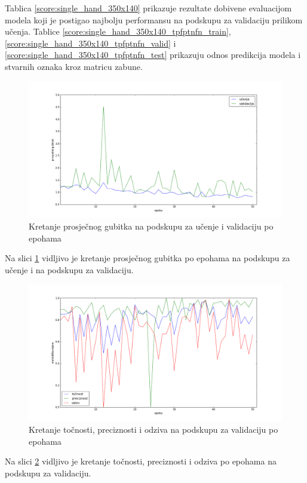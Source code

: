 \documentclass[times, utf8, diplomski, numeric]{fer}
\begin{document}
\noindent Tablica \ref{score:single_hand_350x140} prikazuje rezultate dobivene evaluacijom modela koji je postigao najbolju performansu na podskupu za validaciju prilikom učenja.
Tablice \ref{score:single_hand_350x140_tpfptnfn_train}, \ref{score:single_hand_350x140_tpfptnfn_valid} i \ref{score:single_hand_350x140_tpfptnfn_test} prikazuju odnos predikcija modela i stvarnih oznaka kroz matricu zabune.

\begin{figure}[H]
\centering
\includegraphics[scale=0.35]{images/single_hand_scale050_loss.png}
\caption{Kretanje prosječnog gubitka na podskupu za učenje i validaciju po epohama}
\label{img:single_hand_scale050_loss}
\end{figure}
\noindent Na slici \ref{img:single_hand_scale050_loss} vidljivo je kretanje prosječnog gubitka po epohama na podskupu za učenje i na podskupu za validaciju.

\begin{figure}[H]
\centering
\includegraphics[scale=0.35]{images/single_hand_scale050_acc_ap.png}
\caption{Kretanje točnosti, preciznosti i odziva na podskupu za validaciju po epohama}
\label{img:single_hand_scale050_acc_ap}
\end{figure}
\noindent Na slici \ref{img:single_hand_scale050_acc_ap} vidljivo je kretanje točnosti, preciznosti i odziva po epohama na podskupu za validaciju.
\end{document}
